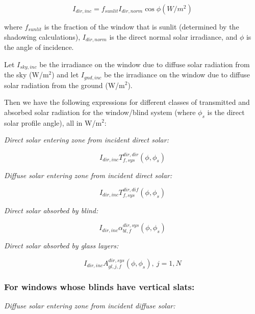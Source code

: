\begin{equation}
{I_{dir,inc}} = {f_{sunlit}}{I_{dir,norm}}\cos \phi {\mathrm{    }}(W/{m^2})
\end{equation}

where \({f_{sunlit}}\) is the fraction of the window that is sunlit (determined by the shadowing calculations), \({I_{dir,norm}}\) is the direct normal solar irradiance, and \(\phi\) is the angle of incidence.

Let \({I_{sky,inc}}\) be the irradiance on the window due to diffuse solar radiation from the sky (W/m\(^{2}\)) and let \({I_{gnd,inc}}\) be the irradiance on the window due to diffuse solar radiation from the ground (W/m\(^{2}\)).

Then we have the following expressions for different classes of transmitted and absorbed solar radiation for the window/blind system (where \({\phi_s}\) is the direct solar profile angle), all in W/m\(^{2}\):

\emph{Direct solar entering zone from incident direct solar:}

\begin{equation}
{I_{dir,inc}}T_{f,sys}^{dir,dir}(\phi ,{\phi_s})
\end{equation}

\emph{Diffuse solar entering zone from incident direct solar:}

\begin{equation}
{I_{dir,inc}}T_{f,sys}^{dir,dif}(\phi ,{\phi_s})
\end{equation}

\emph{Direct solar absorbed by blind:}

\begin{equation}
{I_{dir,inc}}\alpha_{bl,f}^{dir,sys}(\phi ,{\phi_s})
\end{equation}

\emph{Direct solar absorbed by glass layers:}

\begin{equation}
{I_{dir,inc}}A_{gl,j,f}^{dir,sys}(\phi ,{\phi_s}),{\mathrm{    }}~j = 1,N
\end{equation}

\subsubsection{For windows whose blinds have vertical slats:}\label{for-windows-whose-blinds-have-vertical-slats}

\emph{Diffuse solar entering zone from incident diffuse solar:}

